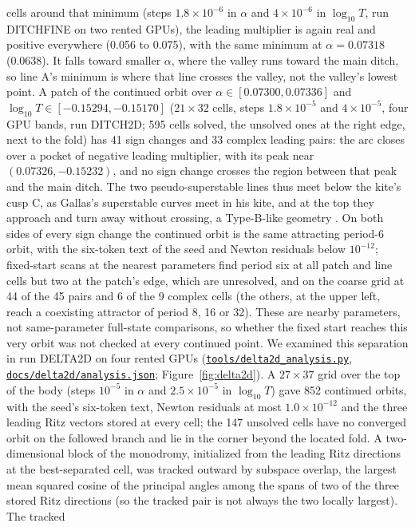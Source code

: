 \documentclass[11pt,letterpaper]{article}
\newcommand{\repourl}{https://github.com/tdj28/neural-shrimp}
\newcommand{\reporef}{arxiv-v1}
\newcommand{\repo}[1]{\href{\repourl/blob/\reporef/#1}{\nolinkurl{#1}}}
\begin{document}
cells around that minimum (steps $1.8\times10^{-6}$ in $\alpha$ and $4\times10^{-6}$ in $\log_{10}T$, run DITCHFINE on
two rented GPUs), the leading multiplier is again real and positive everywhere (0.056 to 0.075), with the same minimum
at $\alpha=0.07318$ (0.0638). It falls toward smaller $\alpha$, where the valley runs toward the main ditch, so line
A's minimum is where that line crosses the valley, not the valley's lowest point. A patch of the continued orbit over $\alpha\in[0.07300,0.07336]$ and $\log_{10}T\in[-0.15294,-0.15170]$
($21\times32$ cells, steps $1.8\times10^{-5}$ and $4\times10^{-5}$, four GPU bands, run DITCH2D; 595 cells solved, the
unsolved ones at the right edge, next to the fold) has 41 sign changes and 33 complex leading pairs: the arc closes over a
pocket of negative leading multiplier, with its peak near $(0.07326,-0.15232)$, and no sign change crosses the region
between that peak and the main ditch. The two pseudo-superstable lines thus meet below the kite's cusp C, as Gallas's
superstable curves meet in his kite, and at the top they approach and turn away without crossing, a Type-B-like
geometry \cite{facanha2013endoskeletons}. On both sides of every sign change the continued orbit is the same attracting
period-6 orbit, with the six-token text of the seed and Newton residuals below $10^{-12}$; fixed-start scans at the nearest parameters find period six at all patch and line cells but two at the patch's edge,
which are unresolved, and on the coarse grid at 44 of the 45 pairs and 6 of the 9 complex cells (the others, at the
upper left, reach a coexisting attractor of period 8, 16 or 32). These are nearby parameters, not same-parameter
full-state comparisons, so whether the fixed start reaches this very orbit was not checked at every continued point. We examined this separation in run DELTA2D on four rented GPUs (\repo{tools/delta2d_analysis.py},
\repo{docs/delta2d/analysis.json}; Figure~\ref{fig:delta2d}). A $27\times37$ grid over the top of the body (steps
$10^{-5}$ in $\alpha$ and $2.5\times10^{-5}$ in $\log_{10}T$) gave 852 continued orbits, with the seed's six-token text,
Newton residuals at most $1.0\times10^{-12}$ and the three leading Ritz vectors stored at every cell; the 147 unsolved
cells have no converged orbit on the followed branch and lie in the corner beyond the located fold. A two-dimensional block of the monodromy, initialized from the leading Ritz directions at the best-separated cell, was
tracked outward by subspace overlap, the largest mean squared cosine of the principal angles among the spans of two of
the three stored Ritz directions (so the tracked pair is not always the two locally largest). The tracked
\end{document}
